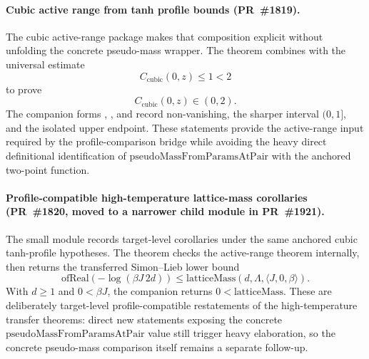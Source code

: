 \documentclass[a4paper,11pt]{article}
\begin{document}
\paragraph{Cubic active range from tanh profile bounds (PR~\#1819).}
The cubic active-range package makes that composition explicit without
unfolding the concrete pseudo-mass wrapper.  The theorem
combines
with the universal estimate
\[
  C_{\mathrm{cubic}}(0,z) \le 1 < 2
\]
to prove
\[
  C_{\mathrm{cubic}}(0,z)\in(0,2).
\]
The companion forms
,
,
and
record non-vanishing, the sharper interval $(0,1]$, and the isolated upper
endpoint.  These statements provide the active-range input required by the
profile-comparison bridge while avoiding the heavy direct definitional
identification of \(\mathrm{pseudoMassFromParamsAtPair}\) with the anchored
two-point function.

\paragraph{Profile-compatible high-temperature lattice-mass corollaries
(PR~\#1820, moved to a narrower child module in PR~\#1921).}
The small module
records target-level corollaries under the same anchored cubic tanh-profile
hypotheses.  The theorem
checks the active-range theorem internally, then returns
the transferred Simon--Lieb lower bound
\[
  \mathrm{ofReal}(-\log(\beta J\,2d))
    \le \mathrm{latticeMass}(d,\Lambda,\langle J,0,\beta\rangle).
\]
With \(d\ge 1\) and \(0<\beta J\), the companion
returns \(0<\mathrm{latticeMass}\).  These are deliberately target-level
profile-compatible restatements of the high-temperature transfer theorems:
direct new statements exposing the concrete
\(\mathrm{pseudoMassFromParamsAtPair}\) value still trigger heavy elaboration,
so the concrete pseudo-mass comparison itself remains a separate follow-up.
\end{document}
